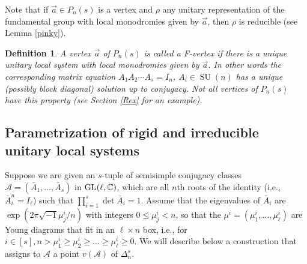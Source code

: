 \documentclass[11pt]{amsart}
\newcommand\op{\operatorname}
\newtheorem{definition}[theorem]{Definition}
\numberwithin{theorem}{subsection}
\begin{document}
 Note that if $\vec{a}\in P_n(s)$ is a vertex and $\rho$ any unitary representation of the fundamental group
 with local monodromies given by $\vec{a}$, then $\rho$ is reducible (see Lemma \ref{pinky}).
\begin{definition}\label{defFprime}
A  vertex $\vec{a}$ of $P_n(s)$ is called a F-vertex if there is a unique unitary local system with  local monodromies given by $\vec{a}$. In other words the corresponding matrix equation  $A_1A_2\cdots A_s=I_n$, $A_i\in \op{SU}(n)$ has a unique (possibly block diagonal) solution up to conjugacy.
Not all vertices of $P_n(s)$ have this property (see Section \ref{Rex} for an example).
\end{definition}
\subsection{Parametrization of rigid and irreducible unitary local systems}\label{newRigid}
 Suppose we are given an $s$-tuple of semisimple  conjugacy classes $\mathcal{A}=(\bar{A}_1,\dots,\bar{A}_s)$ in $\op{GL}(\ell,\Bbb{C})$, which are all $n$th roots of the identity (i.e., $\bar{A}_i^n=I_{\ell}$) such that  $\prod_{i=1}^s\det \bar{A}_i=1$. Assume  that  the eigenvalues of $\bar{A}_i$ are $\exp(2\pi\sqrt{-1}\mu_j^i/n)$ with integers $0\leq \mu_j^i<n$, so that the $\mu^i=(\mu^i_1,\dots,\mu^i_{\ell})$ are Young diagrams that fit in an $\ell\times n$ box, i.e.,  for $i\in [s], n> \mu^i_1\geq \mu^i_2\geq \dots \geq \mu^i_{\ell}\geq 0$. We will describe below a construction that assigns to $\mathcal{A}$ a point $v(\mathcal{A})$ of $\Delta_{n}^s$.
\end{document}
